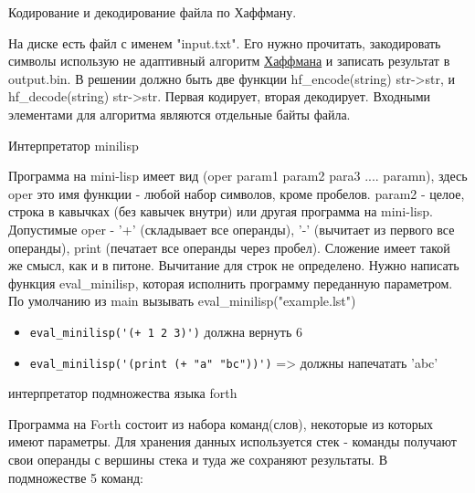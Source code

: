 \documentclass{article}
\begin{document}
\begin{center}Кодирование и декодирование файла по Хаффману.\end{center}
На диске есть файл с именем "input.txt". Его нужно прочитать, закодировать символы 
использую не адаптивный алгоритм 
\href{http://ru.wikipedia.org/wiki/%D0%9A%D0%BE%D0%B4_%D0%A5%D0%B0%D1%84%D1%84%D0%BC%D0%B0%D0%BD%D0%B0}{Хаффмана} 
и записать результат в 
output.bin. В решении должно быть две функции 
hf\_encode(string) str->str, и hf\_decode(string) str->str. Первая кодирует, вторая декодирует. 
Входными элементами для алгоритма являются отдельные байты файла.
\newpage

\begin{center} Интерпретатор minilisp \end{center}
Программа на mini-lisp имеет вид (oper param1 param2 para3 .... paramn),
здесь oper это имя функции - любой набор символов, кроме пробелов.
param2 - целое, строка в кавычках (без кавычек внутри) или другая программа на mini-lisp.
Допустимые oper - '+' (складывает все операнды), '-' (вычитает из первого все операнды), 
print (печатает все операнды через пробел). Сложение имеет такой же смысл, как и в питоне. 
Вычитание для строк не определено. Нужно написать функция eval\_minilisp, которая 
исполнить программу переданную параметром. 
По умолчанию из main вызывать eval\_minilisp("example.lst")

\begin{itemize}
    \item \lstinline!eval_minilisp('(+ 1 2 3)')! должна вернуть 6
    \item \lstinline!eval_minilisp('(print (+ "a" "bc"))')! => должны напечатать 'abc'
\end{itemize}
\newpage


\begin{center} интерпретатор подмножества языка forth \end{center}

      Программа на Forth состоит из набора команд(слов),
      некоторые из которых имеют параметры. Для хранения данных используется стек -
      команды получают свои операнды с вершины стека и туда же сохраняют результаты.
      В  подмножестве 5 команд:
\end{document}
